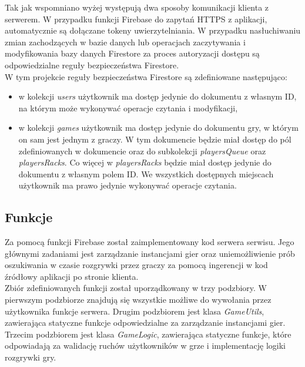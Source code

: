 Tak jak wspomniano wyżej występują dwa sposoby komunikacji klienta z serwerem. W przypadku funkcji Firebase do zapytań HTTPS z aplikacji, automatycznie są dołączane tokeny uwierzytelniania. W przypadku nasłuchiwaniu zmian zachodzących w bazie danych lub operacjach zaczytywania i modyfikowania bazy danych Firestore za proces autoryzacji dostępu są odpowiedzialne reguły bezpieczeństwa Firestore. \\
W tym projekcie reguły bezpieczeństwa Firestore są zdefiniowane następująco:
\begin{itemize}
	\item w kolekcji \emph{users} użytkownik ma dostęp jedynie do dokumentu z własnym ID, na którym może wykonywać operacje czytania i modyfikacji,
	\item w kolekcji \emph{games} użytkownik ma dostęp jedynie do dokumentu gry, w którym on sam jest jednym z graczy. W tym dokumencie będzie miał dostęp do pól zdefiniowanych w dokumencie oraz do subkolekcji \emph{playersQueue} oraz \emph{playersRacks}. Co więcej w \emph{playersRacks} będzie miał dostęp jedynie do dokumentu z własnym polem ID. We wszystkich dostępnych miejscach użytkownik ma prawo jedynie wykonywać operacje czytania.
\end{itemize}

\subsection{Funkcje}

Za pomocą funkcji Firebase został zaimplementowany kod serwera serwisu. Jego głównymi zadaniami jest zarządzanie instancjami gier oraz uniemożliwienie prób oszukiwania w czasie rozgrywki przez graczy za pomocą ingerencji w kod źródłowy aplikacji po stronie klienta. \\

Zbiór zdefiniowanych funkcji został uporządkowany w trzy podzbiory. W pierwszym podzbiorze znajdują się wszystkie możliwe do wywołania przez użytkownika funkcje serwera. Drugim podzbiorem jest klasa \emph{GameUtils}, zawierająca statyczne funkcje odpowiedzialne za zarządzanie instancjami gier. Trzecim podzbiorem jest klasa \emph{GameLogic}, zawierająca statyczne funkcje, które odpowiadają za walidację ruchów użytkowników w grze i implementację logiki rozgrywki gry. \\

